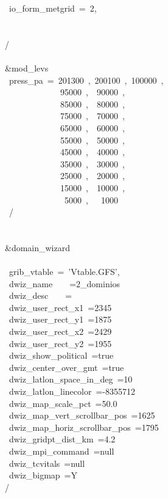 ~io\_form\_metgrid~=~2,\\
\\
\\
/\\
\\
\&mod\_levs\\
~press\_pa~=~201300~,~200100~,~100000~,\\
~~~~~~~~~~~~~95000~,~~90000~,\\
~~~~~~~~~~~~~85000~,~~80000~,\\
~~~~~~~~~~~~~75000~,~~70000~,\\
~~~~~~~~~~~~~65000~,~~60000~,\\
~~~~~~~~~~~~~55000~,~~50000~,\\
~~~~~~~~~~~~~45000~,~~40000~,\\
~~~~~~~~~~~~~35000~,~~30000~,\\
~~~~~~~~~~~~~25000~,~~20000~,\\
~~~~~~~~~~~~~15000~,~~10000~,\\
~~~~~~~~~~~~~~5000~,~~~1000\\
~/\\
\\
\\
\&domain\_wizard\\
\\
~grib\_vtable~=~'Vtable.GFS',\\
~dwiz\_name~~~~=2\_dominios\\
~dwiz\_desc~~~~=\\
~dwiz\_user\_rect\_x1~=2345\\
~dwiz\_user\_rect\_y1~=1875\\
~dwiz\_user\_rect\_x2~=2429\\
~dwiz\_user\_rect\_y2~=1955\\
~dwiz\_show\_political~=true\\
~dwiz\_center\_over\_gmt~=true\\
~dwiz\_latlon\_space\_in\_deg~=10\\
~dwiz\_latlon\_linecolor~=-8355712\\
~dwiz\_map\_scale\_pct~=50.0\\
~dwiz\_map\_vert\_scrollbar\_pos~=1625\\
~dwiz\_map\_horiz\_scrollbar\_pos~=1795\\
~dwiz\_gridpt\_dist\_km~=4.2\\
~dwiz\_mpi\_command~=null\\
~dwiz\_tcvitals~=null\\
~dwiz\_bigmap~=Y\\
/\\




